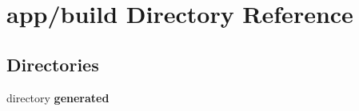 \section{app/build Directory Reference}
\label{dir_ce7d5e2c9c7d4a9160fe57e48690ccb3}
\subsection*{Directories}
\begin{DoxyCompactItemize}
\item 
directory {\bf generated}
\end{DoxyCompactItemize}
